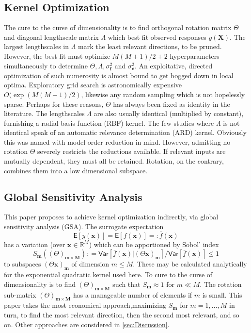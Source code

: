 \documentclass[preprint,12pt]{elsarticle}
\newcommand*{\M}[1]{\ensuremath{#1}\xspace}
\newcommand*{\vr}[1]{\M{\mathbf{#1}}}
\newcommand*{\st}[1]{\M{\mathbb{#1}}}
\newcommand*{\deq}{\M{\mathrel{\mathop:}=}}
\newcommand*{\deqr}{\M{=\mathrel{\mathop:}}}
\newcommand*{\ev}[1]{\mathsf{E}\!\left\lbrack{} #1 \right\rbrack}
\newcommand*{\var}[1]{\mathsf{Var}\!\left\lbrack{} #1 \right\rbrack}
\begin{document}
        \subsection{Kernel Optimization}
            The cure to the curse of dimensionality is to find orthogonal rotation matrix $\Theta$ and diagonal lengthscale matrix $\Lambda$ which best fit observed responses $y(\vr{X})$. The largest lengthscales in $\Lambda$ mark the least relevant directions, to be pruned. However, the best fit must optimize $M(M+1)/2+2$ hyperparameters simultaneously to determine $\Theta, \Lambda, \sigma^{2}_\vr{f}$ and $\sigma^{2}_\vr{e}$. An exploitative, directed optimization of such numerosity is almost bound to get bogged down in local optima. Exploratory grid search is astronomically expensive $O(\exp(M(M+1)/2)$, likewise any random sampling which is not hopelessly sparse. Perhaps for these reasons, $\Theta$ has always been fixed as identity in the literature. The lengthscales $\Lambda$ are also usually identical (multiplied by constant), furnishing a radial basis function (RBF) kernel. The few studies where $\Lambda$ is not identical speak of an automatic relevance determination (ARD) kernel. Obviously this was named with model order reduction in mind. However, admitting no rotation $\Theta$ severely restricts the reductions available. If relevant inputs are mutually dependent, they must all be retained. Rotation, on the contrary, combines them into a low dimensional subspace.

        \subsection{Global Sensitivity Analysis}
            This paper proposes to achieve kernel optimization indirectly, via global sensitivity analysis (GSA).
            The surrogate expectation
            \begin{equation}
                \ev{y(\vr{x})} = \ev{f(\vr{x})} \deqr \bar{f}(\vr{x})
            \end{equation}
            has a variation (over $\vr{x} \in \st{R}^{M}$) which can be apportioned by Sobol' index
            \begin{equation}
                S_{\vr{m}}((\Theta)_{\vr{m}\times\vr{M}}) \deq \var{\bar{f}(\vr{x}) \vert (\Theta \vr{x})_{\vr{m}}} / \var{\bar{f}(\vr{x})} \leq 1
            \end{equation}
            to subspaces $(\Theta \vr{x})_{\vr{m}}$ of dimension $m\leq M$. These may be calculated analytically for the exponential quadratic kernel used here. To cure to the curse of dimensionality is to find $(\Theta)_{\vr{m}\times\vr{M}}$ such that $S_{\vr{m}} \approx 1$ for $m\ll M$. The rotation sub-matrix $(\Theta)_{\vr{m}\times\vr{M}}$ has a manageable number of elements if $m$ is small. This paper takes the most economical approach,maximizing $S_{\vr{m}}$ for $m=1,\ldots,M$ in turn, to find the most relevant direction, then the second most relevant, and so on. Other approaches are considered in \cref{sec:Discussion}.
\end{document}
